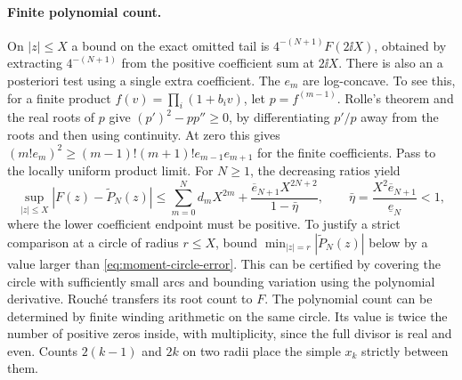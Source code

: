 \paragraph{Finite polynomial count.}
On \(|z|\le X\) a bound on the exact omitted tail is
\(4^{-(N+1)}F(2\ii X)\), obtained by extracting \(4^{-(N+1)}\)
from the positive coefficient sum at \(2\ii X\). There is also an
a posteriori test using a single extra coefficient. The \(e_m\)
are log-concave. To see this, for a finite product
\(f(v)=\prod_i(1+b_i v)\), let \(p=f^{(m-1)}\). Rolle's theorem
and the real roots of \(p\) give \((p')^2-pp''\ge0\), by
differentiating \(p'/p\) away from the roots and then using continuity.
At zero this gives \((m!e_m)^2\ge (m-1)!(m+1)!e_{m-1}e_{m+1}\)
for the finite coefficients. Pass to the locally uniform product limit.
For \(N\ge1\), the decreasing ratios yield
\begin{equation}\label{eq:moment-circle-error}
 \sup_{|z|\le X}|F(z)-\widetilde P_N(z)|
 \le \sum_{m=0}^N d_m X^{2m}
       +\frac{\overline e_{N+1}X^{2N+2}}{1-\bar\eta},
 \qquad
 \bar\eta=\frac{X^2\overline e_{N+1}}{\underline e_N}<1 ,
\end{equation}
where the lower coefficient endpoint must be positive. To justify a
strict comparison at a circle of radius \(r\le X\), bound
\(\min_{|z|=r}|\widetilde P_N(z)|\) below by a value larger than
\eqref{eq:moment-circle-error}. This can be certified by covering the
circle with sufficiently small arcs and bounding variation using the
polynomial derivative. Rouch\'e transfers its root count to \(F\).
The polynomial count can be determined by finite winding arithmetic
on the same circle. Its value is twice the number of positive zeros
inside, with multiplicity, since the full divisor is real and even.
Counts \(2(k-1)\) and \(2k\) on two radii place the simple \(x_k\)
strictly between them.

